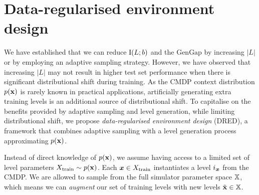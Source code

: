 \section{Data-regularised environment design}\label{c3:sec:ssed}
We have established that we can reduce $\text{I}(L;b)$ and the $\text{GenGap}$ by increasing $|L|$ or by employing an adaptive sampling strategy. However, we have observed that increasing $|L|$ may not result in higher test set performance when there is significant distributional shift during training. As the CMDP context distribution $p({\mathbf{x}})$ is rarely known in practical applications, artificially generating extra training levels is an additional source of distributional shift. To capitalise on the benefits provided by adaptive sampling and level generation, while limiting distributional shift, we propose \textit{data-regularised environment design} (DRED), a framework that combines adaptive sampling with a level generation process approximating $p({\mathbf{x}})$.

Instead of direct knowledge of $p({\mathbf{x}})$, we assume having access to a limited set of level parameters $X_\text{train} \sim p({\mathbf{x}})$. Each ${\bm{x}} \in X_\text{train}$ instantiates a level $i_{\bm{x}}$ from the CMDP. We are allowed to sample from the full simulator parameter space ${\mathbb{X}}$, which means we can \textit{augment} our set of training levels with new levels $\tilde{{\mathbf{x}}} \in {\mathbb{X}}$.


